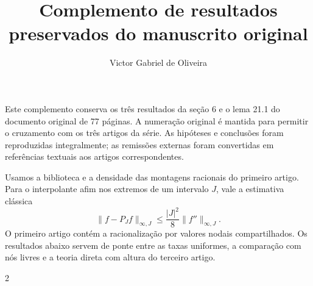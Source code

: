 \documentclass[11pt,a4paper]{article}
\title{Complemento de resultados preservados do manuscrito original}
\author{Victor Gabriel de Oliveira}
\date{}
\theoremstyle{definition}
\theoremstyle{remark}
\begin{document}
\maketitle
Este complemento conserva os três resultados da seção 6 e o lema 21.1 do documento original de 77 páginas. A numeração original é mantida para permitir o cruzamento com os três artigos da série. As hipóteses e conclusões foram reproduzidas integralmente; as remissões externas foram convertidas em referências textuais aos artigos correspondentes.

Usamos a biblioteca e a densidade das montagens racionais do primeiro artigo. Para o interpolante afim nos extremos de um intervalo $J$, vale a estimativa clássica
\begin{equation}
\|f-P_Jf\|_{\infty,J}\le\frac{|J|^2}{8}\|f''\|_{\infty,J}.
\label{eq:interpolation-remainder}
\end{equation}
O primeiro artigo contém a racionalização por valores nodais compartilhados. Os resultados abaixo servem de ponte entre as taxas uniformes, a comparação com nós livres e a teoria direta com altura do terceiro artigo.
\setcounter{section}{5}

\setcounter{section}{20}

\renewcommand{\refname}{Referências}

\begin{multicols}{2}
\footnotesize
\raggedright
\setlength{\bibsep}{2pt}

\end{multicols}
\end{document}
